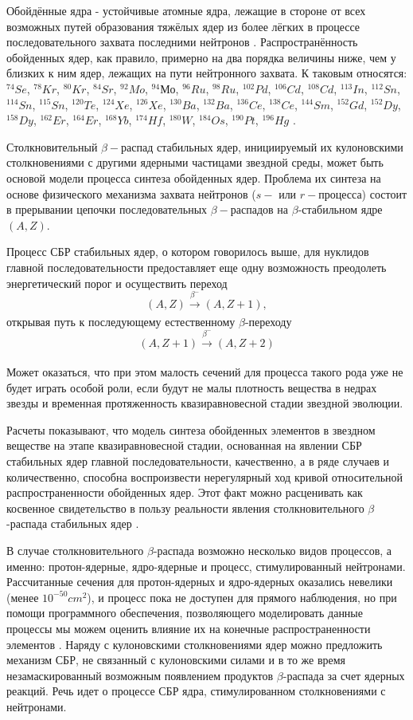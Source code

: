 \documentclass[%
master,    %
natbib,      %
subf,        %
href,        %
colorlinks,  %
]{disser}
\begin{document}
Обойдённые ядра - устойчивые атомные ядра, лежащие в стороне от всех возможных путей образования тяжёлых ядер из более лёгких в процессе последовательного захвата последними нейтронов \cite{reactions}. Распространённость обойденных ядер, как правило, примерно на два порядка величины ниже, чем у близких к ним ядер, лежащих на пути нейтронного захвата. К таковым относятся: $^{74}Se$, $^{78}Kr$, $^{80}Kr$, $^{84}Sr$, $^{92}Mo$, $^{94}Мо$, $^{96}Ru$, $^{98}Ru$, $^{102}Pd$, $^{106}Cd$, $^{108}Cd$, $^{113}In$, $^{112}Sn$, $^{114}Sn$, $^{115}Sn$, $^{120}Te$, $^{124}Xe$, $^{126}Xe$, $^{130}Ba$, $^{132}Ba$, $^{136}Ce$, $^{138}Ce$, $^{144}Sm$, $^{152}Gd$, $^{152}Dy$, $^{158}Dy$, $^{162}Er$, $^{164}Er$, $^{168}Yb$, $^{174}Hf$, $^{180}W$, $^{184}Os$, $^{190}Pt$, $^{196}Hg$ \cite{role}.

Столкновительный $\beta-$распад стабильных ядер, инициируемый их кулоновскими столкновениями с другими ядерными частицами звездной среды, может быть основой модели процесса синтеза обойденных ядер.
Проблема их синтеза на основе физического механизма захвата нейтронов ($s-$ или $r-$процесса) состоит в прерывании цепочки последовательных $\beta-$распадов на $\beta$-стабильном ядре $(A,Z)$.

Процесс СБР стабильных ядер, о котором говорилось выше, для нуклидов главной последовательности предоставляет еще одну возможность преодолеть энергетический порог и осуществить переход 
$$(A,Z) \xrightarrow[]{\beta^-} (A,Z + 1),$$
открывая путь к последующему естественному $\beta$-переходу
$$(A,Z+1) \xrightarrow[]{\beta^-} (A,Z + 2)$$

Может оказаться, что при этом малость сечений для процесса такого рода уже не будет играть особой роли, если будут не малы плотность вещества в недрах звезды и временная протяженность квазиравновесной стадии звездной эволюции.

Расчеты показывают, что модель синтеза обойденных элементов в звездном веществе на этапе квазиравновесной стадии, основанная на явлении СБР стабильных ядер главной последовательности, качественно, а в ряде случаев и количественно, способна воспроизвести нерегулярный ход кривой относительной распространенности обойденных ядер. Этот факт можно расценивать как косвенное свидетельство в пользу реальности явления столкновительного $\beta$-распада стабильных ядер \cite{tak}.

В случае столкновительного $\beta$-распада возможно несколько видов процессов, а именно: протон-ядерные, ядро-ядерные и процесс, стимулированный нейтронами. Рассчитанные сечения для протон-ядерных и ядро-ядерных оказались невелики (менее $10^{-50}cm^2$), и процесс пока не доступен для прямого наблюдения, но при помощи программного обеспечения, позволяющего моделировать данные процессы мы можем оценить влияние их на конечные распространенности элементов \cite{tak_article}. Наряду с кулоновскими столкновениями ядер можно предложить механизм СБР, не связанный с кулоновскими силами и в то же время незамаскированный возможным появлением продуктов $\beta$-распада за счет ядерных реакций. Речь идет о процессе СБР ядра, стимулированном столкновениями с нейтронами.
\end{document}
